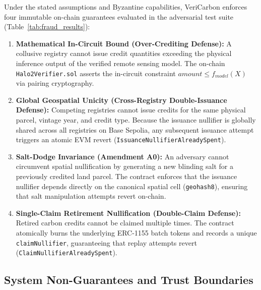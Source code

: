 \documentclass[preprint,12pt]{elsarticle}
\begin{document}
Under the stated assumptions and Byzantine capabilities, VeriCarbon enforces four immutable on-chain guarantees evaluated in the adversarial test suite (Table~\ref{tab:fraud_results}):
\begin{enumerate}
\item \textbf{Mathematical In-Circuit Bound (Over-Crediting Defense):} A collusive registry cannot issue credit quantities exceeding the physical inference output of the verified remote sensing model. The on-chain \texttt{Halo2Verifier.sol} asserts the in-circuit constraint $amount \le f_{model}(X)$ via pairing cryptography.
\item \textbf{Global Geospatial Unicity (Cross-Registry Double-Issuance Defense):} Competing registries cannot issue credits for the same physical parcel, vintage year, and credit type. Because the issuance nullifier is globally shared across all registries on Base Sepolia, any subsequent issuance attempt triggers an atomic EVM revert (\texttt{IssuanceNullifierAlreadySpent}).
\item \textbf{Salt-Dodge Invariance (Amendment A0):} An adversary cannot circumvent spatial nullification by generating a new blinding salt for a previously credited land parcel. The contract enforces that the issuance nullifier depends directly on the canonical spatial cell (\texttt{geohash8}), ensuring that salt manipulation attempts revert on-chain.
\item \textbf{Single-Claim Retirement Nullification (Double-Claim Defense):} Retired carbon credits cannot be claimed multiple times. The contract atomically burns the underlying ERC-1155 batch tokens and records a unique \texttt{claimNullifier}, guaranteeing that replay attempts revert (\texttt{ClaimNullifierAlreadySpent}).
\end{enumerate}

\subsection{System Non-Guarantees and Trust Boundaries}
\end{document}
